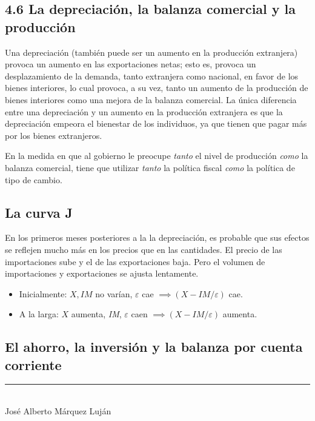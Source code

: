 \documentclass[10pt]{article}
\begin{document}
\begin{multicols*}{2}
\subsection{4.6 La depreciación, la balanza comercial y la producción}
Una depreciación (también puede ser un aumento en la producción extranjera) provoca un aumento en las exportaciones netas; esto es, provoca un desplazamiento de la demanda, tanto extranjera como nacional, en favor de los bienes interiores, lo cual provoca, a su vez, tanto un aumento de la producción de bienes interiores como una mejora de la balanza comercial. La única diferencia entre una depreciación y un aumento en la producción extranjera es que la depreciación empeora el bienestar de los individuos, ya que tienen que pagar más por los bienes extranjeros.

En la medida en que al gobierno le preocupe \textit{tanto} el nivel de producción \textit{como} la balanza comercial, tiene que utilizar \textit{tanto} la política fiscal \textit{como} la política de tipo de cambio.

\subsection{La curva J}
En los primeros meses posteriores a la la depreciación, es probable que sus efectos se reflejen mucho más en los precios que en las cantidades. El precio de las importaciones sube y el de las exportaciones baja. Pero el volumen de importaciones y exportaciones se ajusta lentamente.

\begin{itemize}
    \item Inicialmente: $X, \textit{IM}$ no varían, $\varepsilon$ cae $\implies (X - \textit{IM}/\varepsilon)$ cae.
    \item A la larga: $X$ aumenta, \textit{IM}, $\varepsilon$ caen $\implies (X - \textit{IM}/\varepsilon)$ aumenta.
\end{itemize}

\subsection{El ahorro, la inversión y la balanza por cuenta corriente}


\vfill
\begin{flushright}
    \rule{0.65\linewidth}{0.1pt} \\
    José Alberto Márquez Luján
\end{flushright}

\end{multicols*}
\end{document}
